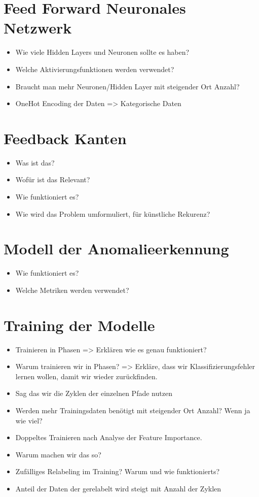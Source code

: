 


\section{Feed Forward Neuronales Netzwerk}
\begin{itemize}
    \item Wie viele Hidden Layers und Neuronen sollte es haben?
    \item Welche Aktivierungsfunktionen werden verwendet?
    \item Braucht man mehr Neuronen/Hidden Layer mit steigender Ort Anzahl?
    \item OneHot Encoding der Daten => Kategorische Daten
\end{itemize}

\section{Feedback Kanten}
\begin{itemize}
    \item Was ist das?
    \item Wofür ist das Relevant?
    \item Wie funktioniert es?
    \item Wie wird das Problem umformuliert, für künstliche Rekurenz?
\end{itemize}

\section{Modell der Anomalieerkennung}
\begin{itemize}
    \item Wie funktioniert es?
    \item Welche Metriken werden verwendet?
\end{itemize}

\section{Training der Modelle}
\begin{itemize}
    \item Trainieren in Phasen => Erklären wie es genau funktioniert?
    \item Warum trainieren wir in Phasen? => Erkläre, dass wir Klassifizierungsfehler lernen wollen, damit wir wieder zurückfinden.
    \item Sag das wir die Zyklen der einzelnen Pfade nutzen
    \item Werden mehr Trainingsdaten benötigt mit steigender Ort Anzahl? Wenn ja wie viel?
    \item Doppeltes Trainieren nach Analyse der Feature Importance.
    \item Warum machen wir das so?
    \item Zufälliges Relabeling im Training? Warum und wie funktionierts?
    \item Anteil der Daten der gerelabelt wird steigt mit Anzahl der Zyklen
\end{itemize}
